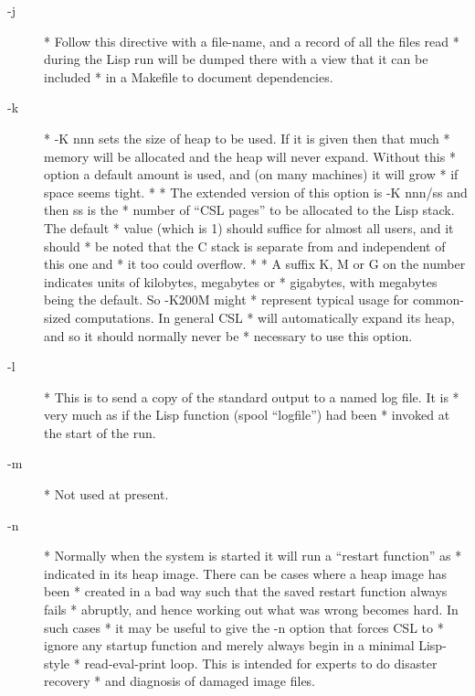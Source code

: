 \documentclass[a4paper,11pt]{article}
\begin{document}
\begin{description}
\item [{\ttfamily -j}] 
          * Follow this directive with a file-name, and a record of all the files read
          * during the Lisp run will be dumped there with a view that it can be included
          * in a Makefile to document dependencies.

\item [{\ttfamily -k}] 
          * {\ttfamily -K nnn} sets the size of heap to be used.  If it is given then that much
          * memory will be allocated and the heap will never expand.  Without this
          * option a default amount is used, and (on many machines) it will grow
          * if space seems tight.
          *
          * The extended version of this option is {\ttfamily -K nnn/ss} and then ss is the
          * number of ``CSL pages'' to be allocated to the Lisp stack. The default
          * value (which is 1) should suffice for almost all users, and it should
          * be noted that the C stack is separate from and independent of this one and
          * it too could overflow.
          *
          * A suffix K, M or G on the number indicates units of kilobytes, megabytes or
          * gigabytes, with megabytes being the default. So {\ttfamily -K200M} might
          * represent typical usage for common-sized computations. In general CSL
          * will automatically expand its heap, and so it should normally never be
          * necessary to use this option.

\item [{\ttfamily -l}] 
          * This is to send a copy of the standard output to a named log file. It is
          * very much as if the Lisp function {\ttfamily (spool ``logfile'')} had been
          * invoked at the start of the run.

\item [{\ttfamily -m}] 
          * Not used at present.

\item [{\ttfamily -n}] 
          * Normally when the system is started it will run a ``restart function'' as
          * indicated in its heap image. There can be cases where a heap image has been
          * created in a bad way such that the saved restart function always fails
          * abruptly, and hence working out what was wrong becomes hard. In such cases
          * it may be useful to give the {\ttfamily -n} option that forces CSL to
          * ignore any startup function and merely always begin in a minimal Lisp-style
          * read-eval-print loop. This is intended for experts to do disaster recovery
          * and diagnosis of damaged image files.


\end{description}
\end{document}
